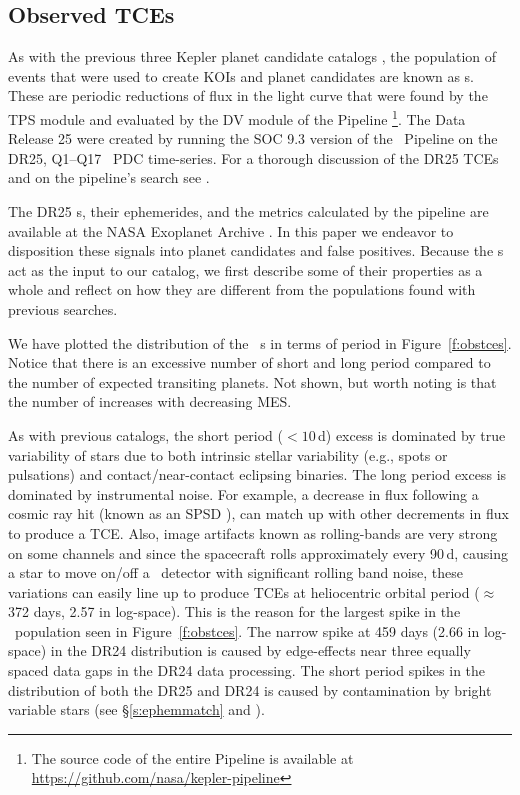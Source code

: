 \subsection{Observed TCEs}

\label{s:tces}
As with the previous three Kepler planet candidate catalogs \citep{Coughlin2016,Mullally2015cat,Rowe2015cat}, the population of events that were used to create KOIs and planet candidates are known as \opstce s. These are periodic reductions of flux in the light curve that were found by the TPS module and evaluated by the DV module of the \Kepler{} Pipeline \citep{JenkinsKDPH} \footnote{The source code of the entire Pipeline is available at \url{https://github.com/nasa/kepler-pipeline}}. The Data Release 25   were created by running the SOC 9.3 version of the \Kepler\ Pipeline on the DR25, Q1--Q17 \Kepler\ PDC time-series.  For a thorough discussion of the DR25 TCEs and on the pipeline's search see \citet{Twicken2016}. 

The DR25 \opstce s, their ephemerides, and the metrics calculated by the pipeline are available at the NASA Exoplanet Archive \citep{Akeson2013}.  In this paper we endeavor to disposition these signals into planet candidates and false positives.  Because the \opstce s act as the input to our catalog, we first describe some of their properties as a whole and reflect on how they are different from the \opstce{} populations found with previous searches.

We have plotted the distribution of the \ntcesnorogue\ \opstce s in terms of period in Figure~\ref{f:obstces}. Notice that there is an excessive number of short and long period  compared to the number of expected transiting planets. Not shown, but worth noting is that the number of  increases with decreasing MES.

As with previous catalogs, the short period ($<10$\,d) excess is dominated by true variability of stars due to both intrinsic stellar variability (e.g., spots or pulsations) and contact/near-contact eclipsing binaries. The long period excess is dominated by instrumental noise. For example, a decrease in flux following a cosmic ray hit (known as an SPSD \citep{KDCH}), can match up with other decrements in flux to produce a TCE. Also, image artifacts known as rolling-bands are very strong on some channels \citep[see \S6.7 of][]{KIH}  and since the spacecraft rolls approximately every 90\,d, causing a star to move on/off a \Kepler\ detector with significant rolling band noise, these variations can easily line up to produce TCEs at  heliocentric orbital period ($\approx$372 days, 2.57 in log-space). This is the reason for the largest spike in the \opstce\ population seen in Figure~\ref{f:obstces}. The narrow spike at 459 days (2.66 in log-space) in the DR24 \opstce{} distribution is caused by edge-effects near three equally spaced data gaps in the DR24 data processing.  The short period spikes in the distribution of both the DR25 and DR24  is caused by contamination by bright variable stars (see \S\ref{s:ephemmatch} and \citet{Coughlin2014}).

